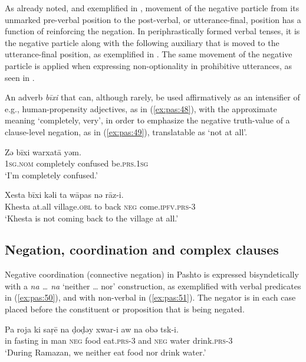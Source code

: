 \documentclass[output=paper,colorlinks,citecolor=brown]{langscibook}
\begin{document}
As already noted, and exemplified in , movement of the negative particle from its unmarked pre-verbal position to the post-verbal, or utterance-final, position has a function of reinforcing the negation. In periphrastically formed verbal tenses, it is the negative particle along with the following auxiliary that is moved to the utterance-final position, as exemplified in . The same movement of the negative particle is applied when expressing non-optionality in prohibitive utterances, as seen in . 

An adverb \textit{bīxi} that can, although rarely, be used affirmatively as an intensifier of e.g., human-propensity adjectives, as in (\ref{ex:pas:48}), with the approximate meaning ‘completely, very’, in order to emphasize the negative truth-value of a clause-level negation, as in (\ref{ex:pas:49}), translatable as ‘not at all’. 

\ea\label{ex:pas:48} 
    \gll Zə bīxi warxatā yəm.\\ 
          \textsc{1sg.nom} completely confused be.\textsc{prs.1sg} \\
    \glt ‘I’m completely confused.’
\z 

\ea\label{ex:pas:49} 
    \gll Xesta bīxi kəli ta wāpas nə rāz-i.\\ 
          Khesta at.all village\textsc{.obl} to back \textsc{neg} come.\textsc{ipfv.prs-3}\\
    \glt ‘Khesta is not coming back to the village at all.’ 
\z 

\subsection{Negation, coordination and complex clauses}\label{sec:pas:4.5}

Negative coordination (connective negation) in Pashto is expressed bisyndetically with a \textit{na … na} ‘neither … nor’ construction, as exemplified with verbal predicates in (\ref{ex:pas:50}), and with non-verbal in (\ref{ex:pas:51}). The negator is in each case placed before the constituent or proposition that is being negated.

\ea\label{ex:pas:50} 
    \gll Pa roja ki saṛē na ḍoḍəy xwar{}-i aw na obə tsk{}-i.\\ 
          in fasting in man \textsc{neg} food eat.\textsc{prs-3} and \textsc{neg} water drink.\textsc{prs-3}\\
    \glt ‘During Ramazan, we neither eat food nor drink water.’
\z 
\end{document}
